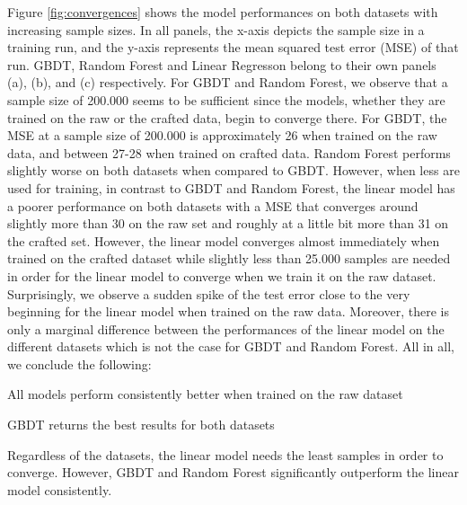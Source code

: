 Figure \ref{fig:convergences} shows the model performances on both datasets with increasing sample sizes. In all panels, the x-axis depicts the sample size in a training run, and the y-axis represents the mean squared test error (MSE) of that run. GBDT, Random Forest and Linear Regresson belong to their own panels (a), (b), and (c) respectively. For GBDT and Random Forest, we observe that a sample size of 200.000 seems to be sufficient since the models, whether they are trained on the raw or the crafted data, begin to converge there. For GBDT, the MSE at a sample size of 200.000 is approximately 26 when trained on the raw data, and between 27-28 when trained on crafted data. Random Forest performs slightly worse on both datasets when compared to GBDT. However, when less are used for training, in contrast to GBDT and Random Forest, the linear model has a poorer performance on both datasets with a MSE that converges around slightly more than 30 on the raw set and roughly at a little bit more than 31 on the crafted set. However, the linear model converges almost immediately when trained on the crafted dataset while slightly less than 25.000 samples are needed in order for the linear model to converge when we train it on the raw dataset. Surprisingly, we observe a sudden spike of the test error close to the very beginning for the linear model when trained on the raw data. Moreover, there is only a marginal difference between the performances of the linear model on the different datasets which is not the case for GBDT and Random Forest.
All in all, we conclude the following:
\begin{description}[font=$\bullet$\scshape\bfseries]
	\item All models perform consistently better when trained on the raw dataset
	\item GBDT returns the best results for both datasets
	\item Regardless of the datasets, the linear model needs the least samples in order to converge. However, GBDT and Random Forest significantly outperform the linear model consistently. 
\end{description}
